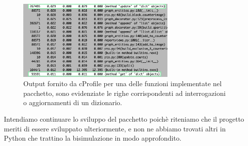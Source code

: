 \begin{figure}[h!]
    \centering
    \includegraphics[width=0.7\textwidth]{./sezione3/future/resources/profiler.png}
    \caption{Output fornito da cProfile per una delle funzioni implementate nel pacchetto, sono evidenziate le righe corrispondenti ad interrogazioni o aggiornamenti di un dizionario.}
    \label{fig:cprofile_result}
\end{figure}

Intendiamo continuare lo sviluppo del pacchetto poichè riteniamo che il progetto meriti di essere sviluppato ulteriormente, e non ne abbiamo trovati altri in Python che trattino la bisimulazione in modo approfondito.
